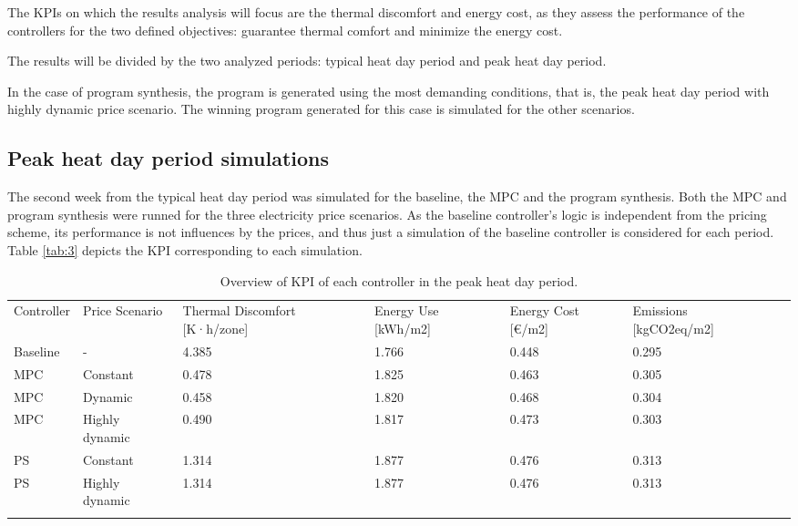 The KPIs on which the results analysis will focus are the thermal discomfort and energy cost, as they assess the performance of the controllers for the two defined objectives: guarantee thermal comfort and minimize the energy cost.

The results will be divided by the two analyzed periods: typical heat day period and peak heat day period.

In the case of program synthesis, the program is generated using the most demanding conditions, that is, the peak heat day period with highly dynamic price scenario. The winning program generated for this case is simulated for the other scenarios.

\subsection{Peak heat day period simulations}
\label{'results_peak'}
The second week from the typical heat day period was simulated for the baseline, the MPC and the program synthesis. Both the MPC and program synthesis were runned for the three electricity price scenarios. As the baseline controller's logic is independent from the pricing scheme, its performance is not influences by the prices, and thus just a simulation of the baseline controller is considered for each period. Table \ref{tab:3} depicts the KPI corresponding to each simulation.

\begin{table}
    \caption{Overview of KPI of each controller in the peak heat day period.}
    \label{tab:2}
    
    \centering
    \begin{tabular}{lllllll}
        \hline
        \noalign{\smallskip}
        Controller & Price Scenario & Thermal Discomfort [K·h/zone] & Energy Use [kWh/m2] & Energy Cost [€/m2] & Emissions [kgCO2eq/m2] \\
        \noalign{\smallskip}
        \hline
        \noalign{\smallskip}
        Baseline & - & 4.385 & 1.766 & 0.448 & 0.295 \\
        MPC & Constant & 0.478 & 1.825 & 0.463 & 0.305 \\
        MPC & Dynamic & 0.458 & 1.820 & 0.468 & 0.304 \\
        MPC & Highly dynamic & 0.490 & 1.817 & 0.473 & 0.303 \\
        PS & Constant & 1.314 & 1.877 & 0.476 & 0.313 \\
        PS & Highly dynamic & 1.314 & 1.877 & 0.476 & 0.313 \\
        \noalign{\smallskip}
        \hline
    \end{tabular}
\end{table}


